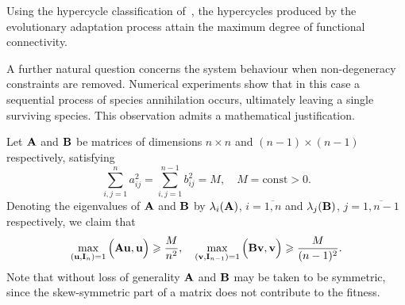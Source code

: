 \documentclass[12pt]{report}
\newcommand{\const}{\mathrm{const}}
\theoremstyle{definition}
\theoremstyle{remark}
\begin{document}
Using the hypercycle classification of~\cite{c3:Eigen1982}, the hypercycles produced by the evolutionary adaptation process attain the maximum degree of functional connectivity.

A further natural question concerns the system behaviour when non-degeneracy constraints are removed. Numerical experiments show that in this case a sequential process of species annihilation occurs, ultimately leaving a single surviving species. This observation admits a mathematical justification.

Let ${\bf A}$ and ${\bf B}$ be matrices of dimensions $n \times n$ and $(n - 1) \times (n - 1)$ respectively, satisfying
$$
	\sum\limits_{i, j = 1}^{n}a_{ij}^{2} = \sum\limits_{i, j = 1}^{n - 1}b_{ij}^{2} = M, \quad M = \const > 0.
$$ 
Denoting the eigenvalues of ${\bf A}$ and ${\bf B}$ by $\lambda_{i}({\bf A})$, $i = \overline{1, n}$ and $\lambda_{j}({\bf B})$, $j = \overline{1, n - 1}$ respectively, we claim that
\begin{equation}
	\max\limits_{({\bf u},{\bf I}_{n}) = 1}\Big({\bf Au}, {\bf u}\Big) \geqslant \frac{M}{n^{2}}, \quad \max\limits_{({\bf v},{\bf I}_{n - 1}) = 1}\Big({\bf Bv}, {\bf v}\Big) \geqslant \frac{M}{(n - 1)^{2}}.
	\label{c3:eq3.30}
\end{equation}
Note that without loss of generality ${\bf A}$ and ${\bf B}$ may be taken to be symmetric, since the skew-symmetric part of a matrix does not contribute to the fitness.
\end{document}
